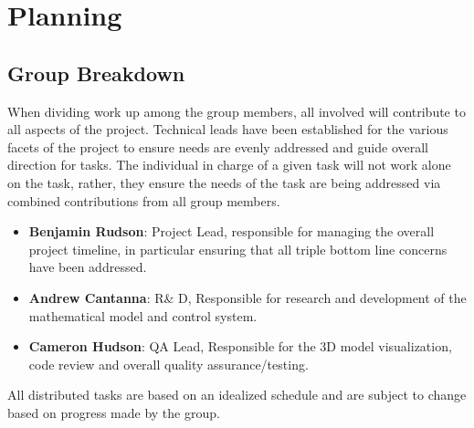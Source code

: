 \section{Planning}
\subsection{Group Breakdown}
When dividing work up among the group members, all involved will contribute to all aspects of the project. Technical leads have been established for the various facets of the project to ensure needs are evenly addressed and guide overall direction for tasks. The individual in charge of a given task will not work alone on the task, rather, they ensure the needs of the task are being addressed via combined contributions from all group members. 
\begin{itemize}
\item \textbf{Benjamin Rudson}: Project Lead, responsible for managing the overall project timeline, in particular ensuring that all triple bottom line concerns have been addressed. 
\item \textbf{Andrew Cantanna}: R\& D, Responsible for research and development of the mathematical model and control system. 
\item \textbf{Cameron Hudson}: QA Lead, Responsible for the 3D model visualization, code review and overall quality assurance/testing.
\end{itemize}
All distributed tasks are based on an idealized schedule and are subject to change based on progress made by the group.
\clearpage
